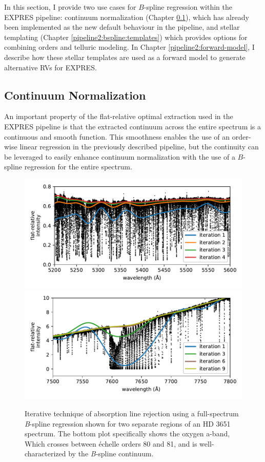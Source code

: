 In this section, I provide two use cases for $B$-spline regression within the EXPRES pipeline: continuum normalization (Chapter \ref{pipeline2:bspline:cont-norm}), which has already been implemented as the new default behaviour in the pipeline, and stellar templating (Chapter \ref{pipeline2:bspline:templates}) which provides options for combining orders and telluric modeling. In Chapter \ref{pipeline2:forward-model}, I describe how these stellar templates are used as a forward model to generate alternative RVs for EXPRES.

\subsection{Continuum Normalization} \label{pipeline2:bspline:cont-norm}

An important property of the flat-relative optimal extraction used in the EXPRES pipeline is that the extracted continuum across the entire spectrum is a continuous and smooth function. This smoothness enables the use of an order-wise linear regression in the previously described pipeline, but the continuity can be leveraged to easily enhance continuum normalization with the use of a $B$-spline regression for the entire spectrum.

\begin{figure}
    \centering
    \includegraphics[width=\textwidth]{figures-5/cont-norm-bspline.pdf}
    \includegraphics[width=\textwidth]{figures-5/cont-norm-bspline-oxygen.pdf}
    \caption[Continuum normalization iterative absorption line rejection]{Iterative technique of absorption line rejection using a full-spectrum \textit{B}-spline regression shown for two separate regions of an HD 3651 spectrum. The bottom plot specifically shows the oxygen a-band, Which crosses between \'echelle orders 80 and 81, and is well-characterized by the \textit{B}-spline continuum.}
    \label{fig:cont-norm-bspline}
\end{figure}

